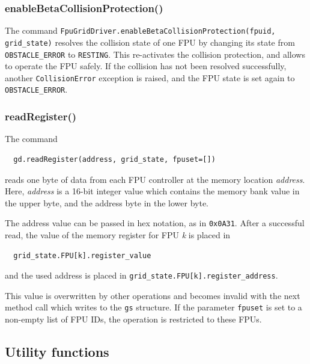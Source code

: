 \documentclass[11pt,a4paper]{scrartcl}
\begin{document}
\subsubsection{enableBetaCollisionProtection()}

The command \texttt{FpuGridDriver.enableBetaCollisionProtection(fpuid,
  grid\_state)} resolves the collision state of one FPU by changing
its state from \texttt{OBSTACLE\_ERROR} to \texttt{RESTING}.  This
re-activates the collision protection, and allows to operate the FPU
safely. If the collision has not been resolved successfully, another
\texttt{CollisionError} exception is raised, and the FPU state is set
again to \texttt{OBSTACLE\_ERROR}.

\subsubsection{readRegister()}
\label{sec:readregister}

The command

\begin{verbatim}
  gd.readRegister(address, grid_state, fpuset=[])
\end{verbatim}
reads one byte of data from each FPU controller
at the memory location \emph{address}. Here,
\emph{address} is a 16-bit integer value
which contains the memory bank value in the
upper byte, and the address byte in the lower byte.

The address value can be passed in hex notation,
as in \texttt{0x0A31}. After a successful read,
the value of the memory register for FPU \emph{k}
is placed in

\begin{verbatim}
  grid_state.FPU[k].register_value
\end{verbatim}
and the used address is placed in
\verb+grid_state.FPU[k].register_address+.


This value is overwritten by other operations and becomes invalid with
the next method call which writes to the \texttt{gs} structure.  If
the parameter \texttt{fpuset} is set to a non-empty list of FPU IDs,
the operation is restricted to these FPUs.


\subsection{Utility functions}
\end{document}
